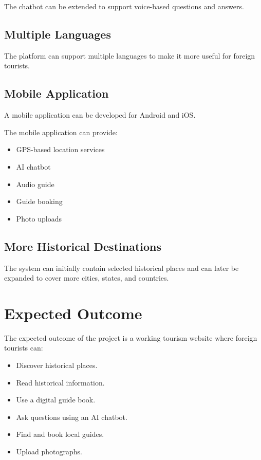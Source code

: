 \documentclass[12pt,a4paper]{article}
\begin{document}
The chatbot can be extended to support voice-based questions and answers.


\subsection{Multiple Languages}

The platform can support multiple languages to make it more useful for
foreign tourists.


\subsection{Mobile Application}

A mobile application can be developed for Android and iOS.

The mobile application can provide:

\begin{itemize}[leftmargin=*]

    \item GPS-based location services
    \item AI chatbot
    \item Audio guide
    \item Guide booking
    \item Photo uploads

\end{itemize}


\subsection{More Historical Destinations}

The system can initially contain selected historical places and can later
be expanded to cover more cities, states, and countries.





\section{Expected Outcome}

The expected outcome of the project is a working tourism website where
foreign tourists can:

\begin{itemize}[leftmargin=*]

    \item Discover historical places.

    \item Read historical information.

    \item Use a digital guide book.

    \item Ask questions using an AI chatbot.

    \item Find and book local guides.

    \item Upload photographs.

\end{itemize}
\end{document}
